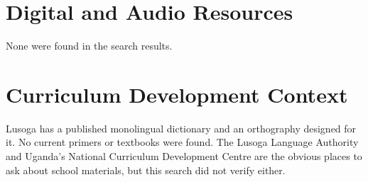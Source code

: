 \documentclass[12pt]{article}
\begin{document}
\section{Digital and Audio Resources}
None were found in the search results.

\section{Curriculum Development Context}
Lusoga has a published monolingual dictionary and an orthography designed for it. No current primers or textbooks were found. The Lusoga Language Authority and Uganda's National Curriculum Development Centre are the obvious places to ask about school materials, but this search did not verify either.
\end{document}
